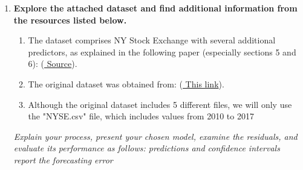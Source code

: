 \documentclass[12pt]{article}
\begin{document}



\pagebreak

\begin{enumerate}

\item \textbf{Explore the attached dataset and find additional information from the resources listed below.}
\begin{enumerate}
\item The dataset comprises NY Stock Exchange with several additional predictors, as explained in the following paper (especially sections 5 and 6):  (\href{https://www.sciencedirect.com/science/article/abs/pii/S0957417419301915}{ Source}).
\item The original dataset was obtained from: (\href{https://archive.ics.uci.edu/ml/datasets/CNNpred\%3A+CNN-based+stock+market+prediction+using+a+diverse+set+of+variablesc}{ This link}).
\item Although the original dataset includes 5 different files, we will only use the "NYSE.csv" file, which includes values from 2010 to 2017
\end{enumerate}

\textit{Explain your process,
present your chosen model, 
examine the residuals, 
and evaluate its performance as follows:
predictions and confidence intervals 
report the forecasting error
}


\newpage

\newpage

\newpage

%









\end{enumerate}
\end{document}

